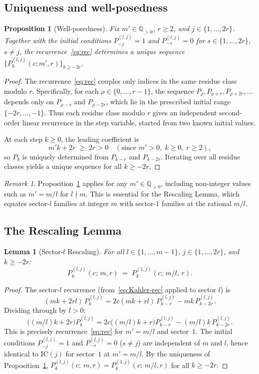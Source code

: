 \documentclass[12pt]{article}
\theoremstyle{plain}
\newtheorem{lemma}[theorem]{Lemma}
\newtheorem{proposition}[theorem]{Proposition}
\theoremstyle{definition}
\theoremstyle{remark}
\newtheorem{remark}[theorem]{Remark}
\newcommand{\Q}{\mathbb{Q}}
\newcommand{\Plk}[2]{P^{(#1)}_{#2}}
\begin{document}
\subsection{Uniqueness and well-posedness}
\begin{proposition}[Well-posedness]\label{prop:unique}
  Fix $m'\in\Q_{>0}$, $r\geq 2$, and $j\in\{1,\ldots,2r\}$.
  Together with the initial conditions $\Plk{l,j}{-j}=1$ and $\Plk{l,j}{-s}=0$
  for $s\in\{1,\ldots,2r\}$, $s\neq j$,
  the recurrence~\eqref{eq:rec} determines a unique sequence
  $\{\Plk{l,j}{k}(c;m',r)\}_{k\geq -2r}$.
\end{proposition}
\begin{proof}
  The recurrence~\eqref{eq:rec} couples only indices in the same residue class
  modulo $r$.  Specifically, for each $\rho\in\{0,\ldots,r-1\}$,
  the sequence $P_{\rho}, P_{\rho+r}, P_{\rho+2r},\ldots$ depends only on
  $P_{\rho-r}$ and $P_{\rho-2r}$, which lie in the prescribed initial range
  $\{-2r,\ldots,-1\}$.
  Thus each residue class modulo $r$ gives an independent second-order linear
  recurrence in the step variable, started from two known initial values.

  At each step $k\geq 0$, the leading coefficient is
  \[
    m'k+2r \;\geq\; 2r > 0
    \quad (\text{since }m'>0,\; k\geq 0,\; r\geq 2),
  \]
  so $P_k$ is uniquely determined from $P_{k-r}$ and $P_{k-2r}$.
  Iterating over all residue classes yields a unique sequence for all $k\geq -2r$.
\end{proof}
\begin{remark}
  Proposition~\ref{prop:unique} applies for any $m'\in\Q_{>0}$, including
  non-integer values such as $m'=m/l$ for $l\nmid m$.
  This is essential for the Rescaling Lemma, which equates sector-$l$
  families at integer $m$ with sector-$1$ families at the rational $m/l$.
\end{remark}
\subsection{The Rescaling Lemma}
\begin{lemma}[Sector-$l$ Rescaling]\label{lem:rescaling}
  For all $l\in\{1,\ldots,m-1\}$, $j\in\{1,\ldots,2r\}$, and $k\geq -2r$:
  \begin{equation}\label{eq:rescaling}
    \Plk{l,j}{k}(c;\,m,r) \;=\; \Plk{1,j}{k}(c;\,m/l,\,r).
  \end{equation}
\end{lemma}
\begin{proof}
  The sector-$l$ recurrence (from~\eqref{eq:Kahler-rec} applied to sector $l$) is
  \[
    (mk+2rl)\,\Plk{l,j}{k} = 2c(mk+rl)\,\Plk{l,j}{k-r} - mk\,\Plk{l,j}{k-2r}.
  \]
  Dividing through by $l>0$:
  \[
    \bigl((m/l)k+2r\bigr)\Plk{l,j}{k}
    = 2c\bigl((m/l)k+r\bigr)\Plk{l,j}{k-r}
    - (m/l)k\,\Plk{l,j}{k-2r}.
  \]
  This is precisely recurrence~\eqref{eq:rec} for $m'=m/l$ and sector~$1$.
  The initial conditions $\Plk{l,j}{-j}=1$ and $\Plk{l,j}{-s}=0$ ($s\neq j$)
  are independent of $m$ and $l$, hence identical to $\mathrm{IC}(j)$ for sector~$1$
  at $m'=m/l$.
  By the uniqueness of Proposition~\ref{prop:unique},
  $\Plk{l,j}{k}(c;\,m,r) = \Plk{1,j}{k}(c;\,m/l,r)$ for all $k\geq -2r$.
\end{proof}
\end{document}
